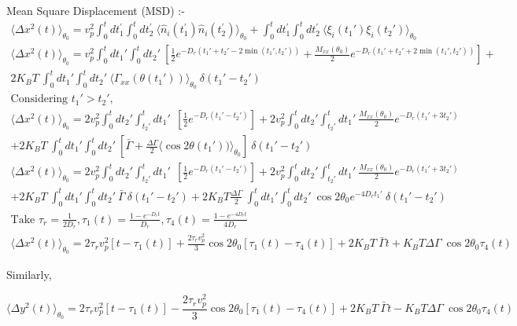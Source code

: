 \documentclass[]{article}
\begin{document}
Mean Square Displacement (MSD) :-
\begin{multline*}
    \langle \Delta x^2(t) \rangle_{\theta_0} =v_p^2\int_0^t dt_1^\prime\int_0^t dt_2^\prime \  \langle \hat n_i(t_1^\prime) \hat n_i(t_2^\prime) \rangle_{\theta_0}+\int_0^tdt_1^\prime\int_0^t dt_2^\prime \  \langle\xi_i(t_1\prime)\xi_i(t_2\prime)\rangle_{\theta_0}
\\ \langle \Delta x^2(t) \rangle_{\theta_0}=v_p^2\int_0^t dt_1\prime\int_0^t dt_2\prime \ [ \frac{1}{2}e^{-D_r(t_1\prime+t_2\prime-2 \min(t_1\prime,t_2\prime))}+\frac{M_{xx}(\theta_0)}{2}e^{-D_r(t_1\prime+t_2\prime+2 \min(t_1\prime,t_2\prime))}] + 
\\ 2 K_B T \ \int_0^tdt_1\prime\int_0^t dt_2\prime \  \langle\Gamma_{xx}(\theta (t_1\prime))\rangle_{\theta_0} \ \delta(t_1\prime-t_2\prime)
\\ \text{Considering } t_1\prime > t_2\prime,
\\ \langle \Delta x^2(t) \rangle_{\theta_0}=2v_p^2\int_0^t dt_2\prime\int_{t_2\prime}^t dt_1\prime \ \ [ \frac{1}{2}e^{-D_r(t_1\prime-t_2\prime)}] +2v_p^2\int_0^t dt_2\prime\int_{t_2\prime}^t dt_1\prime \ \frac{M_{xx}(\theta_0)}{2}e^{-D_r(t_1\prime+3t_2\prime )}
\\+ 2 K_B T \ \int_0^tdt_1\prime\int_0^t dt_2\prime \ [\bar\Gamma  + \frac{\Delta \Gamma}{2} \langle \cos 2 \theta(t_1\prime))\rangle_{\theta_0} ]\ \delta(t_1\prime-t_2\prime)
\\ \langle \Delta x^2(t) \rangle_{\theta_0}=2v_p^2\int_0^t dt_2\prime\int_{t_2\prime}^t dt_1\prime \ \ [ \frac{1}{2}e^{-D_r(t_1\prime-t_2\prime)}] +2v_p^2\int_0^t dt_2\prime\int_{t_2\prime}^t dt_1\prime \ \frac{M_{xx}(\theta_0)}{2}e^{-D_r(t_1\prime+3t_2\prime )}
\\+ 2 K_B T \ \int_0^tdt_1\prime\int_0^t dt_2\prime \ \bar\Gamma \ \delta(t_1\prime-t_2\prime)+ 2 K_B T \frac{\Delta \Gamma}{2}  \ \int_0^tdt_1\prime\int_0^t dt_2\prime \ \cos 2 \theta_0 e^{-4D_r t_1\prime}  \ \delta(t_1\prime-t_2\prime)
\\ \text{Take }\tau_r = \frac {1}{2D_r},\tau_1(t)=\frac{1-e^{-D_rt}}{D_r},\tau_4(t)=\frac{1-e^{-4D_rt}}{4D_r}
\\ \langle \Delta x^2(t) \rangle_{\theta_0}=2\tau_r v_p^2[ t-\tau_1(t)]+\frac{2\tau_rv_p^2}{3} \cos 2\theta_0 [\tau_1(t)-\tau_4(t)]+2 K_B T \ \bar\Gamma t+ K_B T \Delta \Gamma  \ \cos 2 \theta_0 \tau_4(t)
\end{multline*}


Similarly,

$$\langle \Delta y^2(t) \rangle_{\theta_0}=2\tau_r v_p^2[ t-\tau_1(t)]-\frac{2\tau_rv_p^2}{3} \cos 2\theta_0 [\tau_1(t)-\tau_4(t)]+2 K_B T \ \bar\Gamma t- K_B T \Delta \Gamma  \ \cos 2 \theta_0 \tau_4(t)$$
\end{document}
